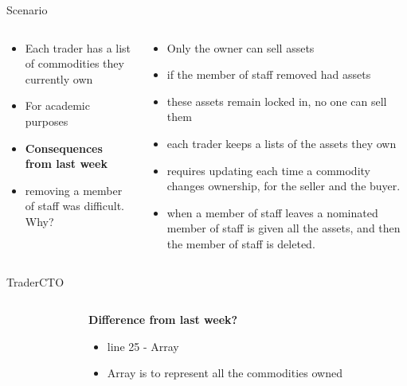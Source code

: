 \documentclass[pdf,table]{beamer}
\begin{document}
\begin{frame}{Scenario}
	\begin{columns}[T]
		\begin{column}{0.48\textwidth}
			\begin{itemize}
				\item Each trader has a list of commodities they currently own
				\item For academic purposes
				\item {\bf Consequences from last week}
				\item removing a member of staff was difficult. Why?
			\end{itemize}
		\end{column}
		\begin{column}{0.48\textwidth}
			\begin{itemize}
				\item<2-> Only the owner can sell assets
				\item<2-> if the member of staff removed had assets
				\item<3-> these assets remain locked in, no one can sell them
				\item<4-> each trader keeps a lists of the assets they own
				\item<4-> requires updating each time a commodity changes ownership, for the seller and the buyer.
				\item<5-> when a member of staff leaves a nominated member of staff is given all the assets, and then the member of staff is deleted.
			\end{itemize}
		\end{column}
	\end{columns}	
\end{frame}


\begin{frame}{Trader}{CTO}
	\begin{columns}[T]
		\begin{column}{0.58\textwidth}
			
		\end{column}
		\begin{column}{0.38\textwidth}
			{\bf Difference from last week? }
			\begin{itemize}
				\item<2-> line 25 - Array
				\item<2-> Array is to represent all the commodities owned
			\end{itemize}
		\end{column}
	\end{columns}	
\end{frame}
\end{document}

